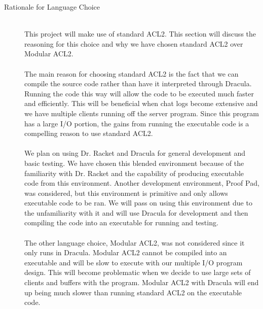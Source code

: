 \documentclass[11pt, letterpaper]{report}
\begin{document}
\begin{description}
\newpage
\hypertarget{R} {}
\item[Rationale for Language Choice] \hfill \\ 
This project will make use of standard ACL2. This section will discuss the reasoning for this choice and why we have chosen standard ACL2 over Modular ACL2. \\ \\
The main reason for choosing standard ACL2 is the fact that we can compile the source code rather than have it interpreted through Dracula. Running the code this way will allow the code to be executed much faster and efficiently. This will be beneficial when chat logs become extensive and we have multiple clients running off the server program. Since this program has a large I/O portion, the gains from running the executable code is a compelling reason to use standard ACL2.\\ \\
We plan on using Dr. Racket and Dracula for general development and basic testing. We have chosen this blended environment because of the familiarity with Dr. Racket and the capability of producing executable code from this environment. Another development environment, Proof Pad, was considered, but this environment is primitive and only allows executable code to be ran. We will pass on using this environment due to the unfamiliarity with it and will use Dracula for development and then compiling the code into an executable for running and testing.  \\ \\
The other language choice, Modular ACL2, was not considered since it only runs in Dracula. Modular ACL2 cannot be compiled into an executable and will be slow to execute with our multiple I/O program design. This will become problematic when we decide to use large sets of clients and buffers with the program. Modular ACL2 with Dracula will end up being much slower than running standard ACL2 on the executable code.


\end{description}
\end{document}
